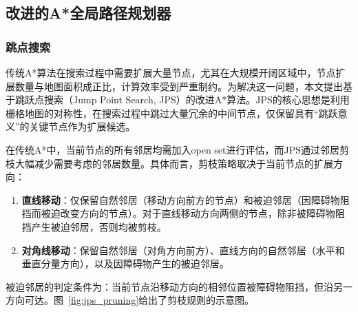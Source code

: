 \documentclass[lettersize,journal]{IEEEtran}
\begin{document}
\subsection{改进的A*全局路径规划器}

\label{subsec:jps}

\subsubsection{跳点搜索}

传统A*算法在搜索过程中需要扩展大量节点，尤其在大规模开阔区域中，节点扩展数量与地图面积成正比，计算效率受到严重制约。为解决这一问题，本文提出基于跳跃点搜索（Jump Point Search, JPS）的改进A*算法\cite{ref11,ref12}。JPS的核心思想是利用栅格地图的对称性，在搜索过程中跳过大量冗余的中间节点，仅保留具有``跳跃意义''的关键节点作为扩展候选。

在传统A*中，当前节点的所有邻居均需加入open set进行评估，而JPS通过邻居剪枝大幅减少需要考虑的邻居数量。具体而言，剪枝策略取决于当前节点的扩展方向：

\begin{enumerate}

\item \textbf{直线移动}：仅保留自然邻居（移动方向前方的节点）和被迫邻居（因障碍物阻挡而被迫改变方向的节点）。对于直线移动方向两侧的节点，除非被障碍物阻挡产生被迫邻居，否则均被剪枝。

\item \textbf{对角线移动}：保留自然邻居（对角方向前方）、直线方向的自然邻居（水平和垂直分量方向），以及因障碍物产生的被迫邻居。

\end{enumerate}

被迫邻居的判定条件为：当前节点沿移动方向的相邻位置被障碍物阻挡，但沿另一方向可达。图~\textcolor{blue}{\ref{fig:jps_pruning}}给出了剪枝规则的示意图。
\end{document}
